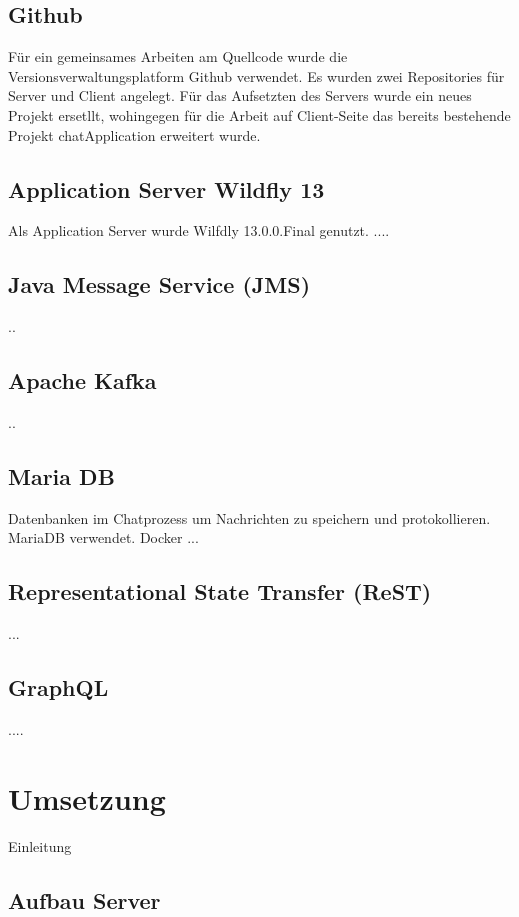 \documentclass[10pt,journal,compsoc]{IEEEtran}
\begin{document}
\subsection{Github}
Für ein gemeinsames Arbeiten am Quellcode wurde die Versionsverwaltungsplatform Github verwendet. Es wurden zwei Repositories für Server und Client angelegt. Für das Aufsetzten des Servers wurde ein neues Projekt ersetllt, wohingegen für die Arbeit auf Client-Seite das bereits bestehende Projekt chatApplication erweitert wurde.

\subsection{Application Server Wildfly 13}

Als Application Server wurde Wilfdly 13.0.0.Final genutzt. ....


\subsection{Java Message Service (JMS)}
..
\subsection{Apache Kafka}
..



\subsection{Maria DB}
Datenbanken im Chatprozess um Nachrichten zu speichern und protokollieren. MariaDB verwendet. Docker ...

\subsection{Representational State Transfer (ReST)}
...

\subsection{GraphQL}
....





\section{Umsetzung}
Einleitung
\subsection{Aufbau Server}
\end{document}
